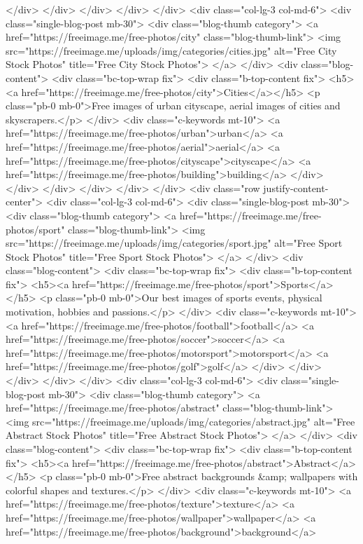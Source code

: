 </div>
</div>
</div>
</div>
</div>
<div class="col-lg-3 col-md-6">
<div class="single-blog-post mb-30">
<div class="blog-thumb category">
<a href="https://freeimage.me/free-photos/city" class="blog-thumb-link">
<img src="https://freeimage.me/uploads/img/categories/cities.jpg" alt="Free City Stock Photos" title="Free City Stock Photos">
</a>
</div>
<div class="blog-content">
<div class="bc-top-wrap fix">
<div class="b-top-content fix">
<h5><a href="https://freeimage.me/free-photos/city">Cities</a></h5>
<p class="pb-0 mb-0">Free images of urban cityscape, aerial images of cities and skyscrapers.</p>
</div>
<div class="c-keywords mt-10">
<a href="https://freeimage.me/free-photos/urban">urban</a> <a href="https://freeimage.me/free-photos/aerial">aerial</a> <a href="https://freeimage.me/free-photos/cityscape">cityscape</a> <a href="https://freeimage.me/free-photos/building">building</a>
</div>
</div>
</div>
</div>
</div>
</div>
<div class="row justify-content-center">
<div class="col-lg-3 col-md-6">
<div class="single-blog-post mb-30">
<div class="blog-thumb category">
<a href="https://freeimage.me/free-photos/sport" class="blog-thumb-link">
<img src="https://freeimage.me/uploads/img/categories/sport.jpg" alt="Free Sport Stock Photos" title="Free Sport Stock Photos">
</a>
 </div>
<div class="blog-content">
<div class="bc-top-wrap fix">
<div class="b-top-content fix">
<h5><a href="https://freeimage.me/free-photos/sport">Sports</a></h5>
<p class="pb-0 mb-0">Our best images of sports events, physical motivation, hobbies and passions.</p>
</div>
<div class="c-keywords mt-10">
<a href="https://freeimage.me/free-photos/football">football</a> <a href="https://freeimage.me/free-photos/soccer">soccer</a> <a href="https://freeimage.me/free-photos/motorsport">motorsport</a> <a href="https://freeimage.me/free-photos/golf">golf</a>
</div>
</div>
</div>
</div>
</div>
<div class="col-lg-3 col-md-6">
<div class="single-blog-post mb-30">
<div class="blog-thumb category">
<a href="https://freeimage.me/free-photos/abstract" class="blog-thumb-link">
<img src="https://freeimage.me/uploads/img/categories/abstract.jpg" alt="Free Abstract Stock Photos" title="Free Abstract Stock Photos">
</a>
</div>
<div class="blog-content">
<div class="bc-top-wrap fix">
<div class="b-top-content fix">
<h5><a href="https://freeimage.me/free-photos/abstract">Abstract</a></h5>
<p class="pb-0 mb-0">Free abstract backgrounds &amp; wallpapers with colorful shapes and textures.</p>
</div>
<div class="c-keywords mt-10">
<a href="https://freeimage.me/free-photos/texture">texture</a> <a href="https://freeimage.me/free-photos/wallpaper">wallpaper</a> <a href="https://freeimage.me/free-photos/background">background</a>
